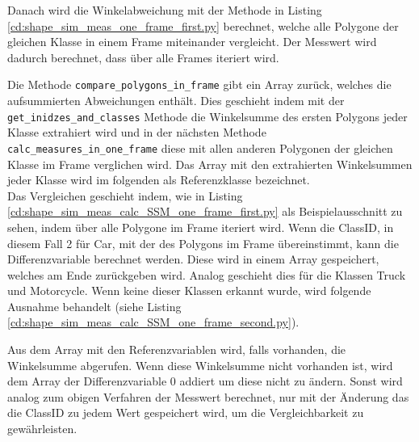 {	Danach wird die Winkelabweichung mit der Methode in Listing \ref{cd:shape_sim_meas_one_frame_first.py} berechnet, welche alle Polygone der gleichen Klasse in einem Frame miteinander vergleicht. Der Messwert wird dadurch berechnet, dass über alle Frames iteriert wird.
	 
	Die Methode \lstinline|compare_polygons_in_frame| gibt ein Array zurück, welches die aufsummierten Abweichungen enthält. Dies geschieht indem mit der \lstinline|get_inidzes_and_classes| Methode die Winkelsumme des ersten Polygons jeder Klasse extrahiert wird und in der nächsten Methode \linebreak \lstinline|calc_measures_in_one_frame| diese mit allen anderen Polygonen der gleichen Klasse im Frame verglichen wird. Das Array mit den extrahierten Winkelsummen jeder Klasse wird im folgenden als Referenzklasse bezeichnet.\\
	Das Vergleichen geschieht indem, wie in Listing \ref{cd:shape_sim_meas_calc_SSM_one_frame_first.py} als Beispielausschnitt zu sehen, indem über alle Polygone im Frame iteriert wird. Wenn die ClassID, in diesem Fall 2 für Car, mit der des Polygons im Frame übereinstimmt, kann die Differenzvariable berechnet werden. 
	 Diese wird in einem Array gespeichert, welches am Ende zurückgeben wird. Analog geschieht dies für die Klassen Truck und Motorcycle. Wenn keine dieser Klassen erkannt wurde, wird folgende Ausnahme behandelt (siehe Listing \ref{cd:shape_sim_meas_calc_SSM_one_frame_second.py}). 
	 
	Aus dem Array mit den Referenzvariablen wird, falls vorhanden, die Winkelsumme abgerufen. Wenn diese Winkelsumme nicht vorhanden ist, wird dem Array der Differenzvariable 0 addiert um diese nicht zu ändern. Sonst wird analog zum obigen Verfahren der Messwert berechnet, nur mit der Änderung das die ClassID zu jedem Wert gespeichert wird, um die Vergleichbarkeit zu gewährleisten. \\
}
